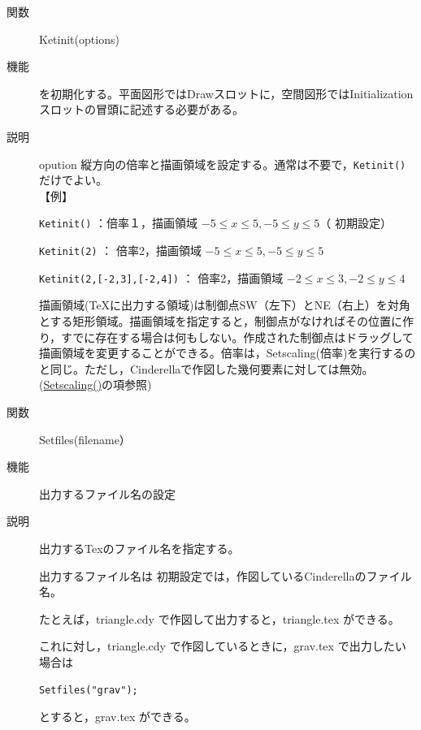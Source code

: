 \documentclass[papersize,a4paper,12pt,uplatex]{jsarticle}
\begin{document}
\begin{description}

\vspace{\baselineskip}
\hypertarget{ketinit}{}
\item[関数]  Ketinit(options)
\item[機能]  \ketcindy を初期化する。平面図形ではDrawスロットに，空間図形ではInitialization スロットの冒頭に記述する必要がある。
\item[説明]  opution 縦方向の倍率と描画領域を設定する。通常は不要で，\verb|Ketinit()| だけでよい。\\

【例】

\verb|Ketinit()|   ：倍率１，描画領域 $-5 \leq x \leq 5 , -5 \leq y \leq 5$（ 初期設定）

\verb|Ketinit(2)| ： 倍率2，描画領域 $-5 \leq x \leq 5 , -5 \leq y \leq 5$

\verb|Ketinit(2,[-2,3],[-2,4])| ： 倍率2，描画領域 $-2 \leq x \leq 3 , -2 \leq y \leq 4$

\vspace{\baselineskip}
描画領域(TeXに出力する領域)は制御点SW（左下）とNE（右上）を対角とする矩形領域。描画領域を指定すると，制御点がなければその位置に作り，すでに存在する場合は何もしない。作成された制御点はドラッグして描画領域を変更することができる。倍率は，Setscaling(倍率)を実行するのと同じ。ただし，Cinderellaで作図した幾何要素に対しては無効。(\hyperlink{setscaling}{Setscaling()}の項参照)


\vspace{\baselineskip}
\hypertarget{setfiles}{}
\item[関数]  Setfiles(filename）
\item[機能]  出力するファイル名の設定
\item[説明]  出力するTexのファイル名を指定する。

出力するファイル名は 初期設定では，作図しているCinderellaのファイル名。

たとえば，triangle.cdy で作図して出力すると，triangle.tex ができる。

これに対し，triangle.cdy で作図しているときに，grav.tex で出力したい場合は

\hspace{10mm}  \verb|Setfiles("grav");|

とすると，grav.tex ができる。


\end{description}
\end{document}
